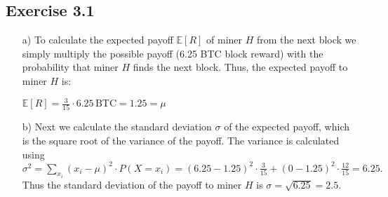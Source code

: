\documentclass[12pt]{article}
\begin{document}
	\subsection*{Exercise 3.1}
	\begin{itemize}
		\item[a)] To calculate the expected payoff $\mathbb{E}[R]$ of miner $H$ from the next block we simply multiply the possible payoff (6.25 BTC block reward) with the probability that miner $H$ finds the next block. Thus, the expected payoff to miner $H$ is:
		\begin{center}
			$\mathbb{E}[R] = \frac{3}{15} \cdot 6.25 \, \text{BTC} = 1.25 = \mu$
		\end{center}
		\item[b)] Next we calculate the standard deviation $\sigma$ of the expected payoff, which is the square root of the variance of the payoff. The variance is calculated using\\[0.2cm]
		$\sigma^2 = \sum_{x_i}(x_i - \mu)^2 \cdot P(X=x_i) = (6.25-1.25)^{2} \cdot \frac{3}{15} + (0-1.25)^{2} \cdot \frac{12}{15} =  6.25.$\\[0.3cm]
		Thus the standard deviation of the payoff to miner $H$ is $\sigma = \sqrt{6.25} = 2.5$.
	\end{itemize}
	
\end{document}
